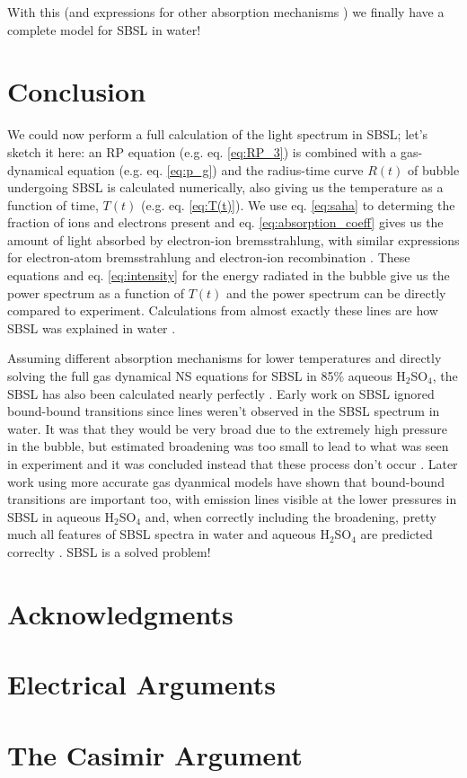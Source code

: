 \documentclass[prb,aps,nofootinbib,superscriptaddress,floatfix]{revtex4-2}
\begin{document}
With this (and expressions for other absorption mechanisms \cite{an2009diagnosing,hilgenfeldt1999simple,zel2002physics}) we finally have a complete model for SBSL in water! 

\section{Conclusion}
We could now perform a full calculation of the light spectrum in SBSL; let's sketch it here: an RP equation (e.g. eq. \ref{eq:RP_3}) is combined with a gas-dynamical equation (e.g. eq. \ref{eq:p_g}) and the radius-time curve $R(t)$ of bubble undergoing SBSL is calculated numerically, also giving us the temperature as a function of time, $T(t)$ (e.g. eq. \ref{eq:T(t)}).  We use eq. \ref{eq:saha} to determing the fraction of ions and electrons present and eq. \ref{eq:absorption_coeff} gives us the amount of light absorbed by electron-ion bremsstrahlung, with similar expressions for electron-atom bremsstrahlung \cite{geltman1973free} and electron-ion recombination \cite{hilgenfeldt1999simple,an2006mechanism,an2008spectral,an2009diagnosing,zel2002physics}. These equations and eq. \ref{eq:intensity} for the energy radiated in the bubble give us the power spectrum as a function of $T(t)$ and the power spectrum can be directly compared to experiment. Calculations from almost exactly these lines are how SBSL was explained in water \cite{hilgenfeldt1999simple,hilgenfeldt1999sonoluminescence,brenner2002single,yasui2018acoustic}. 

Assuming different absorption mechanisms for lower temperatures and directly solving the full gas dynamical NS equations for SBSL in 85\% aqueous H$_2$SO$_4$, the SBSL has also been calculated nearly perfectly \cite{an2006mechanism,an2008spectral,an2009diagnosing}. Early work on SBSL ignored bound-bound transitions since lines weren't observed in the SBSL spectrum in water. It was that they would be very broad due to the extremely high pressure in the bubble, but estimated broadening was too small to lead to what was seen in experiment and it was concluded instead that these process don't occur \cite{hilgenfeldt1999simple,hilgenfeldt1999sonoluminescence}. Later work using more accurate gas dyanmical models have shown that bound-bound transitions are important too, with emission lines visible at the lower pressures in SBSL in aqueous H$_2$SO$_4$ \cite{an2006mechanism,an2008spectral,an2006mechanism} and, when correctly including the broadening, pretty much all features of SBSL spectra in water and aqueous H$_2$SO$_4$ are predicted correclty \cite{suslick2008inside,flannigan2006measurement,flannigan2005plasma}. SBSL is a solved problem!

\section{Acknowledgments}

\appendix
\section{Electrical Arguments}
\section{The Casimir Argument}



\end{document}
